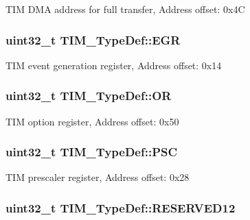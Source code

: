 T\-I\-M D\-M\-A address for full transfer, Address offset\-: 0x4\-C \hypertarget{struct_t_i_m___type_def_a04248d87f48303fd2267810104a7878d}{
\subsubsection[{E\-G\-R}]{ uint32\-\_\-t T\-I\-M\-\_\-\-Type\-Def\-::\-E\-G\-R}}\label{struct_t_i_m___type_def_a04248d87f48303fd2267810104a7878d}
T\-I\-M event generation register, Address offset\-: 0x14 \hypertarget{struct_t_i_m___type_def_acb0e8a4efa46dac4a2fb1aa3d45924fd}{
\subsubsection[{O\-R}]{ uint32\-\_\-t T\-I\-M\-\_\-\-Type\-Def\-::\-O\-R}}\label{struct_t_i_m___type_def_acb0e8a4efa46dac4a2fb1aa3d45924fd}
T\-I\-M option register, Address offset\-: 0x50 \hypertarget{struct_t_i_m___type_def_ad03c852f58077a11e75f8af42fa6d921}{
\subsubsection[{P\-S\-C}]{ uint32\-\_\-t T\-I\-M\-\_\-\-Type\-Def\-::\-P\-S\-C}}\label{struct_t_i_m___type_def_ad03c852f58077a11e75f8af42fa6d921}
T\-I\-M prescaler register, Address offset\-: 0x28 \hypertarget{struct_t_i_m___type_def_aebbca147242a5ef58c8d5fe097df2ca5}{
\subsubsection[{R\-E\-S\-E\-R\-V\-E\-D12}]{\setlength{\rightskip}{0pt plus 5cm}uint32\-\_\-t T\-I\-M\-\_\-\-Type\-Def\-::\-R\-E\-S\-E\-R\-V\-E\-D12}}\label{struct_t_i_m___type_def_aebbca147242a5ef58c8d5fe097df2ca5}
